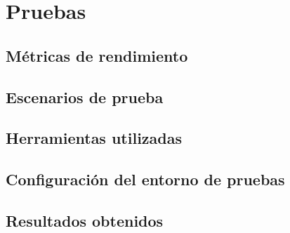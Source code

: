 \section{Pruebas}
\subsection{Métricas de rendimiento}
\subsection{Escenarios de prueba}
\subsection{Herramientas utilizadas}
\subsection{Configuración del entorno de pruebas}
\subsection{Resultados obtenidos}